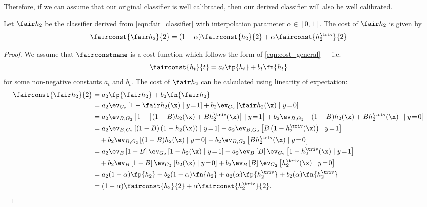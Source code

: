Therefore, if we can assume that our original classifier is well calibrated, then
our derived classifier will also be well calibrated.
%
\begin{lemma} \label{lma:interpolation}
  Let $\fair h_2$ be the classifier derived from \eqref{eqn:fair_classifier}
  with interpolation parameter $\alpha \in [0, 1]$.
  The cost of $\fair h_2$ is given by
  \[
    \fairconst{\fair h_2}{2} = (1 - \alpha) \fairconst{h_2}{2} + \alpha \fairconst{h^\triv_2}{2}
  \]
\end{lemma}
%
\begin{proof}
  We assume that $\fairconstname$ is a cost function which follows the form of \eqref{eqn:cost_general} ---
  i.e.
  \[ \fairconst{h_t}{t} = a_t \fp{h_t} + b_t \fn{h_t} \]
  for some non-negative constants $a_t$ and $b_t$.
  The cost of $\fair h_2$ can be calculated using linearity of expectation:
  \begin{align*}
    \fairconst{\fair h_2}{2} &= a_2 \fp{\fair h_2} + b_2 \fn{\fair h_2}
    \\&= a_2 \ev_{G_2} \left[ 1 -  \fair h_2(\x) \mid y\!=\!1 \right] + b_2 \ev_{G_2} \left[ \fair h_2(\x) \mid y\!=\!0 \right]
    \\&= a_2 \ev_{B,G_2} \left[ 1 - \left[ (1-B) h_2(\x) + B h^\triv_2(\x) \right] \mid y\!=\!1 \right]
    + b_2 \ev_{B,G_2} \left[ \left[ (1-B) h_2(\x) + B h^\triv_2(\x) \right] \mid y\!=\!0 \right]
    \\&=                a_2 \ev_{B,G_2} \left[ (1-B) \left( 1 - h_2(\x) \right) \mid y\!=\!1 \right]
    + a_2 \ev_{B,G_2} \left[ B \left( 1 -  h^\triv_2(\x) \right) \mid y\!=\!1 \right]
    \\&\phantom{=} \:
    + b_2 \ev_{B,G_2} \left[ (1-B) h_2(\x) \mid y\!=\!0 \right]
    + b_2 \ev_{B,G_2} \left[ B h^\triv_2(\x) \mid y\!=\!0 \right]
    \\&=                a_2 \ev_{B} \left[ 1-B \right] \ev_{G_2} \left[ 1 - h_2(\x) \mid y\!=\!1 \right]
    + a_2 \ev_{B} \left[ B \right]   \ev_{G_2} \left[ 1 -  h^\triv_2(\x) \mid y\!=\!1 \right]
    \\&\phantom{=} \:
    + b_2 \ev_{B} \left[ 1-B \right] \ev_{G_2} \left[ h_2(\x) \mid y\!=\!0 \right]
    + b_2 \ev_{B} \left[ B \right]   \ev_{G_2} \left[ h^\triv_2(\x) \mid y\!=\!0 \right]
    \\&= a_2 (1-\alpha) \fp{h_2} + b_2 (1-\alpha) \fn{h_2}
    + a_2 (\alpha) \fp{h^\triv_2} + b_2 (\alpha) \fn{h^\triv_2}
    \\&= (1 - \alpha) \fairconst{h_2}{2} + \alpha \fairconst{h^\triv_2}{2}.
  \end{align*}
\end{proof}

